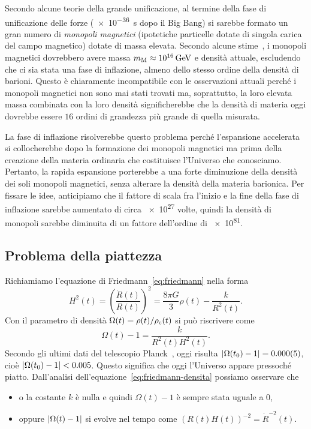 Secondo alcune teorie della grande unificazione, al termine della fase di
unificazione delle forze (\SI{e-36}{\second} dopo il Big Bang) si sarebbe
formato un gran numero di \emph{monopoli magnetici} (ipotetiche particelle
dotate di singola carica del campo magnetico) dotate di massa elevata.  Secondo
alcune stime~\parencite[143-145]{2002coec.book.....C}, i monopoli magnetici
dovrebbero avere massa \(m_{\textup{M}} \approx \SI{e16}{\giga\electronvolt}\) e
densità attuale, escludendo che ci sia stata una fase di inflazione, almeno
dello stesso ordine della densità di barioni.  Questo è chiaramente
incompatibile con le osservazioni attuali perché i monopoli magnetici non sono
mai stati trovati ma, soprattutto, la loro elevata massa combinata con la loro
densità significherebbe che la densità di materia oggi dovrebbe essere \(16\)
ordini di grandezza più grande di quella misurata.

La fase di inflazione risolverebbe questo problema perché l'espansione
accelerata si collocherebbe dopo la formazione dei monopoli magnetici ma prima
della creazione della materia ordinaria che costituisce l'Universo che
conosciamo.  Pertanto, la rapida espansione porterebbe a una forte diminuzione
della densità dei soli monopoli magnetici, senza alterare la densità della
materia barionica.  Per fissare le idee, anticipiamo che il fattore di scala fra
l'inizio e la fine della fase di inflazione sarebbe aumentato di circa \num{e27}
volte, quindi la densità di monopoli sarebbe diminuita di un fattore dell'ordine
di \num{e81}.

\subsection{Problema della piattezza}
\label{sec:problema-piattezza}

Richiamiamo l'equazione di Friedmann~\eqref{eq:friedmann} nella forma
\begin{equation}
  \label{eq:friedmann2}
  H^{2}(t) = \left(\frac{\dot{R}(t)}{R(t)}\right)^{2} = \frac{8\pi G}{3}\rho(t)
  - \frac{k}{R^{2}(t)}.
\end{equation}
Con il parametro di densità \(\Omega(t) = \rho(t)/\rho_{\textup{c}}(t)\) si può
riscrivere come
\begin{equation}
  \label{eq:friedmann-densita}
  \Omega(t) - 1 = \frac{k}{R^{2}(t)H^{2}(t)}.
\end{equation}
Secondo gli ultimi dati del telescopio Planck~\parencite{2015arXiv150201589P},
oggi risulta \(\abs{\Omega(t_{0}) - 1} = \num{0.000(5)}\), cioè
\(\abs{\Omega(t_{0}) - 1} < \num{0.005}\).  Questo significa che oggi l'Universo
appare pressoché piatto.  Dall'analisi
dell'equazione~\eqref{eq:friedmann-densita} possiamo osservare che
\begin{itemize}
\item o la costante \(k\) è nulla e quindi \(\Omega(t) - 1\) è sempre stata
  uguale a \(0\),
\item oppure \(\abs{\Omega(t) - 1}\) si evolve nel tempo come \((R(t)H(t))^{-2}
  = \dot{R}^{-2}(t)\).
\end{itemize}

